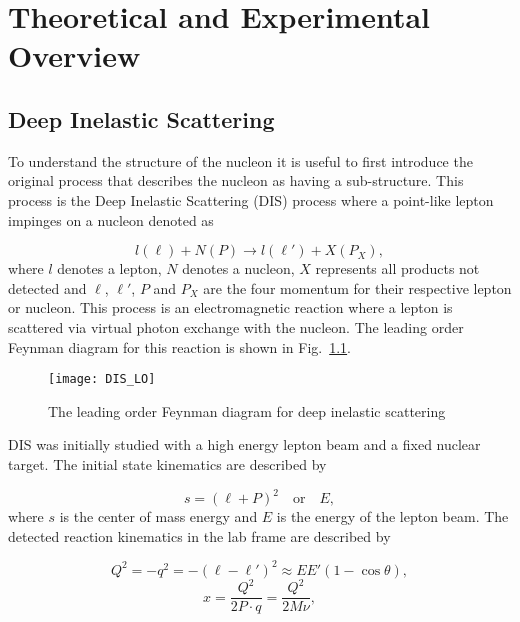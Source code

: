\chapter{Theoretical and Experimental Overview} \label{ch::theory_exp}
\ifpdf
\graphicspath{{Chapters/Theory/Figs/}}
\fi

\section{Deep Inelastic Scattering}
To understand the structure of the nucleon it is useful to first introduce the
original process that describes the nucleon as having a sub-structure.  This
process is the Deep Inelastic Scattering (DIS) process where a point-like lepton
impinges on a nucleon denoted as

\begin{equation}
l(\ell) + N(P) \rightarrow l(\ell') + X(P_X),
\end{equation}
\noindent
where $l$ denotes a lepton, $N$ denotes a nucleon, $X$ represents all products
not detected and $\ell$, $\ell'$, $P$ and $P_X$ are the four momentum for their
respective lepton or nucleon.  This process is an electromagnetic reaction where
a lepton is scattered via virtual photon exchange with the nucleon.  The
leading order Feynman diagram for this reaction is shown in
Fig.~\ref{fig::DIS_LO}.

\begin{figure}[h!t]
  \centering
  \texttt{[image: DIS\_LO]}
  \caption{The leading order Feynman diagram for deep inelastic scattering}
  \label{fig::DIS_LO}
\end{figure}

DIS was initially studied with a high energy lepton beam and a fixed nuclear
target.  The initial state kinematics are described by

\begin{equation}
  s = (\ell+P)^2 \quad \mathrm{or} \quad E,
\end{equation}
\noindent
where $s$ is the center of mass energy and $E$ is the energy of the lepton beam.
The detected reaction kinematics in the lab frame are described by

\begin{multicols}{2}
  \noindent
  \begin{equation}
    \label{equ::DIS_Q2}
    Q^2 = -q^2 = -(\ell - \ell')^2 \approx EE'(1-\cos\theta ),
  \end{equation}
  \begin{equation}
      \label{equ::BjorkenX}
      x = \frac{Q^2}{2P \cdot q} = \frac{Q^2}{2M\nu},
  \end{equation}
\end{multicols}

